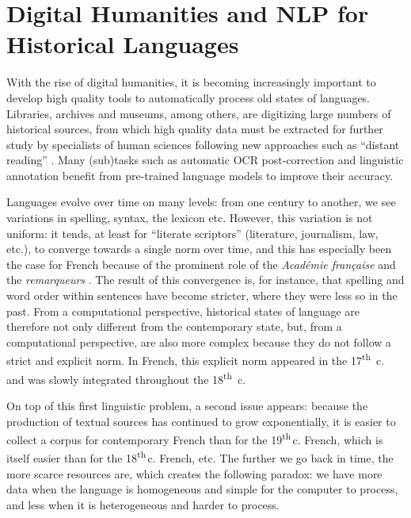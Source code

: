 \section{Digital Humanities and NLP for Historical Languages}

With the rise of digital humanities, it is becoming increasingly important to develop high quality tools to automatically process old states of languages. Libraries, archives and museums, among others, are digitizing large numbers of historical sources, from which high quality data must be extracted for further study by specialists of human sciences following new approaches such as ``distant reading'' \cite{moretti-2013-distant}. Many (sub)tasks such as automatic OCR post-correction \cite{rijhwani-etal-2021-lexically} and linguistic annotation \cite{camps-etal-2021-corpus} benefit from pre-trained language models to improve their accuracy.

Languages evolve over time on many levels: from one century to another, we see variations in spelling, syntax, the lexicon etc. However, this variation is not uniform: it tends, at least for ``literate scriptors'' (literature, journalism, law, etc.), to converge towards a single norm over time, and this has especially been the case for French because of the prominent role of the \emph{Académie française} and the \emph{remarqueurs} \cite{ayres-bennett-etal-2011-remarques}. The result of this convergence is, for instance, that spelling and word order within sentences have become stricter, where they were less so in the past. From a computational perspective, historical states of language are therefore not only different from the contemporary state, but, from a computational perspective, are also more complex because they do not follow a strict and explicit norm. In French, this explicit norm  appeared in the 17\textsuperscript{th}~c. and was slowly integrated throughout the 18\textsuperscript{th}~c.

On top of this first linguistic problem, a second issue appears: because the production of textual sources has continued to grow exponentially, it is easier to collect a corpus for contemporary French  than for the 19\textsuperscript{th}\,c. French, which is itself easier than for the 18\textsuperscript{th}\,c. French, etc. The further we go back in time, the more scarce resources are, which creates the following paradox: we have more data when the language is homogeneous and simple for the computer to process, and less when it is heterogeneous and harder to process.


